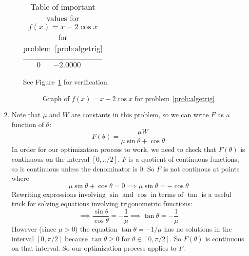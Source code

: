 \documentclass{article}
\begin{document}
\begin{enumerate}
\begin{enumerate}
\begin{table}[htbp]
\begin{tabular}{|l|l|l|}
        $\phantom{-}0$    & $-2.0000$ &         \\ \hline 
      \end{tabular}
      \caption{Table of important values for $f(x)=x-2\cos x$ for problem~\ref{prob:algetrig}}
      \label{tab:algetrig}
    \end{table}  
    See Figure~\ref{fig:algetrig} for verification.
    \begin{figure}[htbp]
      \centering
      \caption{Graph of $f(x)=x-2\cos x$ for problem~\ref{prob:algetrig}}
      \label{fig:algetrig}
    \end{figure}
  \end{enumerate}
\item %
  Note that $\mu$ and $W$ are constants in this problem, so we can write
  $F$ as a function of $\theta$:
  \begin{equation*}
    F(\theta) = \frac{\mu W}{\mu\sin\theta + \cos\theta}
  \end{equation*}
  In order for our optimization process to work, we need to check that
  $F(\theta)$ is continuous on the interval $[0,\pi/2]$.  $F$ is a quotient
  of continuous functions, so is continuous unless the denominator is $0$.
  So $F$ is not continous at points where
  \begin{equation*}
    \mu\sin\theta + \cos\theta = 0
    \implies \mu\sin\theta = -\cos\theta
  \end{equation*}
  Rewriting expressions involving $\sin$ and $\cos$ in terms of $\tan$ is
  a useful trick for solving equations involving trigonometric functions:
  \begin{equation*}
    \implies \frac{\sin\theta}{\cos\theta} = -\frac{1}{\mu}
    \implies \tan\theta =-\frac{1}{\mu}
  \end{equation*}
  However (since $\mu>0$)
  the equation $\tan\theta=-1/\mu$ has no solutions in the interval
  $[0,\pi/2]$ because $\tan\theta\ge 0$ for $\theta\in[0,\pi/2]$.  So
  $F(\theta)$ is continuous on that interval.  So our optimization process
  applies to $F$.


\end{enumerate}
\end{document}
